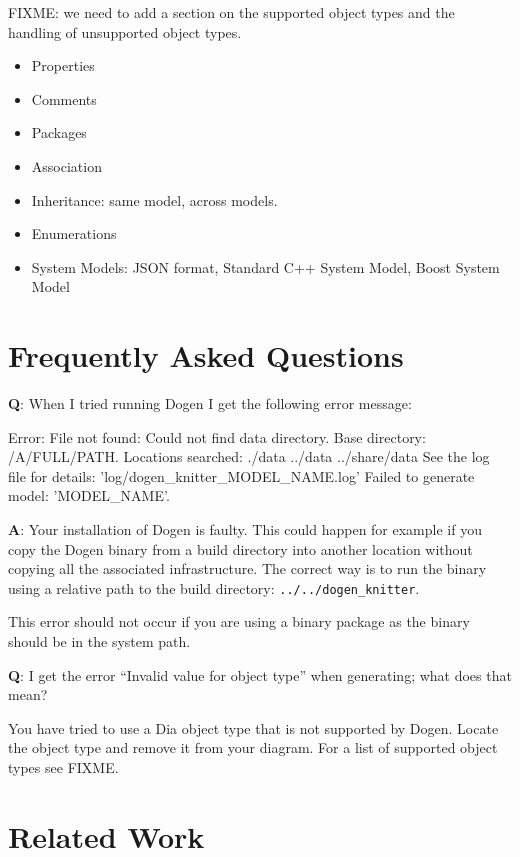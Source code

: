 \documentclass{book}
\begin{document}
FIXME: we need to add a section on the supported object types and the
handling of unsupported object types.

\begin{itemize}
\item Properties
\item Comments
\item Packages
\item Association
\item Inheritance: same model, across models.
\item Enumerations
\item System Models: JSON format, Standard C++ System Model, Boost System Model
\end{itemize}

\chapter{Frequently Asked Questions}

\textbf{Q}: When I tried running Dogen I get the following error
message:

\begin{pseudocode}[backgroundcolor=\color{lightgray}]
Error: File not found: Could not find data directory.
Base directory: /A/FULL/PATH. Locations searched: ./data ../data ../share/data
See the log file for details: 'log/dogen_knitter_MODEL_NAME.log'
Failed to generate model: 'MODEL_NAME'.
\end{pseudocode}

\textbf{A}: Your installation of Dogen is faulty. This could happen
for example if you copy the Dogen binary from a build directory into
another location without copying all the associated
infrastructure. The correct way is to run the binary using a relative
path to the build directory: \texttt{../../dogen\_knitter}.

This error should not occur if you are using a binary package as the
binary should be in the system path.

\textbf{Q}: I get the error ``Invalid value for object type'' when
generating; what does that mean?

You have tried to use a Dia object type that is not supported by
Dogen. Locate the object type and remove it from your diagram. For a
list of supported object types see FIXME.

\appendix

\chapter{Related Work}
\end{document}

